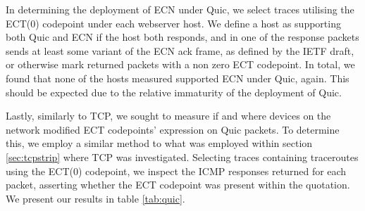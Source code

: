 \documentclass{l4proj}
\begin{document}
In determining the deployment of ECN under Quic, we select traces utilising the ECT(0) codepoint under each webserver host. We define a host as supporting both Quic and ECN if the host both responds, and in one of the response packets sends at least some variant of the ECN ack frame, as defined by the IETF draft\cite{thomson_quic_2020}, or otherwise mark returned packets with a non zero ECT codepoint. In total, we found that none of the hosts measured supported ECN under Quic, again. This should be expected due to the relative immaturity of the deployment of Quic.

Lastly, similarly to TCP, we sought to measure if and where devices on the network modified ECT codepoints' expression on Quic packets. To determine this, we employ a similar method to what was employed within section \ref{sec:tcpstrip} where TCP was investigated. Selecting traces containing traceroutes using the ECT(0) codepoint, we inspect the ICMP responses returned for each packet, asserting whether the ECT codepoint was present within the quotation. We present our results in table \ref{tab:quic}.
\end{document}
